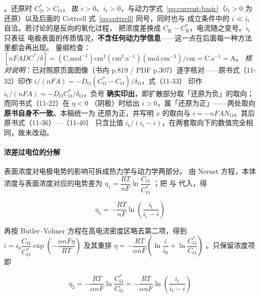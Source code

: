 。还原时 $C_{\mathrm{O}}^*>C_{\mathrm{O}}$，
故 $i>0$、$i_{\mathrm{t}}>0$，与动力学式~\eqref{eq:current-basic}（$i_{\mathrm{f}}>0$ 为
还原）以及后面的 Cottrell 式~\eqref{eq:cottrell} 同号，同时也与
 成立条件中的 $i\ll i_{\mathrm{t}}$ 自洽。若讨论的是反向的氧化过程，
把浓度差换成 $C_{\mathrm{R}}-C_{\mathrm{R}}^*$，电流随之变号。$i_{\mathrm{t}}$ 只表征
电极表面的传质情况，\textbf{不含任何动力学信息}——这一点在后面每一种方法里都会再出现。
量纲检查：$[nFAD C^*/\delta]=(\mathrm{C.mol^{-1}})\mathrm{cm^2}
(\mathrm{cm^2.s^{-1}})(\mathrm{mol.cm^{-3}})/\mathrm{cm}=\mathrm{C.s^{-1}}=\mathrm{A}$。
\emph{核对说明}：已对照原页面图像（书内 p.819 / PDF p.307）逐字核对——原书式（11-32）印作
$i/(nFA)=-D_{\mathrm{O}}(C_{\mathrm{O}}^*-C_{\mathrm{O}})/\delta_{\mathrm{O}}$，式（11-33）
印作 $i_{\mathrm{t}}/(nFA)=-D_{\mathrm{O}}C_{\mathrm{O}}^*/\delta_{\mathrm{O}}$，负号
\textbf{确实印出}，即扩散部分取「还原为负」的取向；而同书式（11-22）在 $\eta<0$
（阴极）时给出 $i>0$，属「还原为正」——两处取向\textbf{原书自身不一致}。本稿统一为
还原为正，并写明 $x$ 的取向与 $i=-nFA N_{\mathrm{O}}$。其后原书式（11-36）—（11-40）
只含比值 $i_{\mathrm{t}}/(i_{\mathrm{t}}-i)$，在两套取向下的数值完全相同，故未改动。

\paragraph{浓差过电位的分解} 表面浓度对电极电势的影响可拆成热力学与动力学两部分。
由 Nernst 方程，本体浓度与表面浓度对应的电势差为
$\eta_1=\dfrac{RT}{nF}\ln\dfrac{C_{\mathrm{O}}}{C_{\mathrm{O}}^*}$
；把  与
 代入，得

\begin{equation}
\eta_1=-\frac{RT}{nF}\ln\!\left(\frac{i_{\mathrm{t}}}{i_{\mathrm{t}}-i}\right)
\label{eq:eta1}
\end{equation}

再按 Butler--Volmer 方程在高电流密度区略去第二项，得到
$i=i_0\dfrac{C_{\mathrm{O}}}{C_{\mathrm{O}}^*}
\exp\!\left(-\dfrac{\alpha nF\eta}{RT}\right)$ 及其重排
$\eta=-\dfrac{RT}{\alpha nF}\left(\ln\dfrac{i}{i_0}
+\ln\dfrac{C_{\mathrm{O}}^*}{C_{\mathrm{O}}}\right)$
。只保留浓度项即

\begin{equation}
\eta_2=-\frac{RT}{\alpha nF}\ln\frac{C_{\mathrm{O}}^*}{C_{\mathrm{O}}}
=-\frac{RT}{\alpha nF}\ln\!\left(\frac{i_{\mathrm{t}}}{i_{\mathrm{t}}-i}\right)
\label{eq:eta2}
\end{equation}

